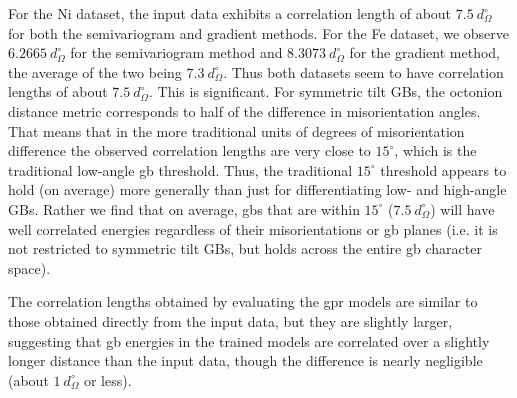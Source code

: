 \documentclass[final,twocolumn,12pt]{elsarticle}
\begin{document}
	For the Ni dataset, the input data exhibits a correlation length of about $7.5\ d_{\Omega}^{\circ}$ for both the semivariogram and gradient methods. For the Fe dataset, we observe $6.2665\ d_{\Omega}^{\circ}$ for the semivariogram method and $8.3073\ d_{\Omega}^{\circ}$ for the gradient method, the average of the two being $7.3\ d_{\Omega}^{\circ}$. Thus both datasets seem to have correlation lengths of about $7.5\ d_{\Omega}^{\circ}$. This is significant. For symmetric tilt GBs, the octonion distance metric corresponds to half of the difference in misorientation angles. That means that in the more traditional units of degrees of misorientation difference the observed correlation lengths are very close to $15^{\circ}$, which is the traditional low-angle \gls{gb} threshold. Thus, the traditional $15^{\circ}$ threshold appears to hold (on average) more generally than just for differentiating low- and high-angle GBs. Rather we find that on average, \glspl{gb} that are within $15^{\circ}$ ($7.5\ d_{\Omega}^{\circ}$) will have well correlated energies regardless of their misorientations or \gls{gb} planes (i.e. it is not restricted to symmetric tilt GBs, but holds across the entire \gls{gb} character space).
	
	The correlation lengths obtained by evaluating the \gls{gpr} models are similar to those obtained directly from the input data, but they are slightly larger, suggesting that \gls{gb} energies in the trained models are correlated over a slightly longer distance than the input data, though the difference is nearly negligible (about $1\ d_{\Omega}^{\circ}$ or less).
	
\end{document}
